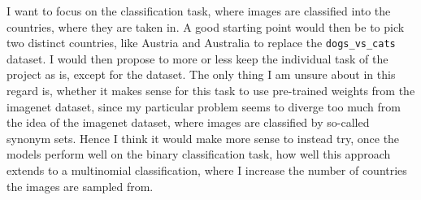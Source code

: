 \documentclass{article}
\begin{document}
I want to focus on the classification task, where images are classified into the countries, where they are taken in.
A good starting point would then be to pick two distinct countries, like Austria and Australia
to replace the \texttt{dogs\_vs\_cats} dataset. I would then propose
to more or less keep the individual task of the project as is, except
for the dataset. The only thing I am unsure about in this regard is,
whether it makes sense for this task to use pre-trained weights from
the imagenet dataset, since my particular problem seems to
diverge too much from the idea of the imagenet dataset, where images
are classified by so-called synonym sets.
Hence I think it would make more sense to instead try,
once the models perform well
on the binary classification task, how
well this approach extends to a multinomial classification, where I
increase the number of countries the images are sampled from.
\end{document}
